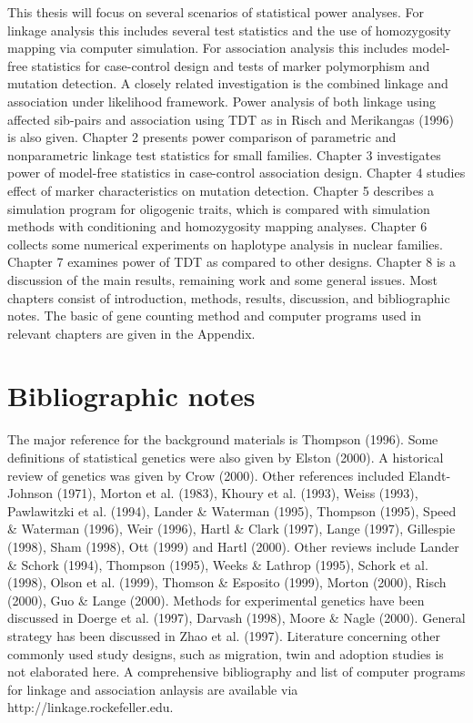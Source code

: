 This thesis will focus on several scenarios of statistical power analyses.  For
linkage analysis this includes several test statistics and the use of
homozygosity mapping via computer simulation.  For association analysis this
includes model-free statistics for case-control design and tests of marker
polymorphism and mutation detection.  A closely related investigation is the
combined linkage and association under likelihood framework.  Power analysis of
both linkage using affected sib-pairs and association using TDT as in Risch and
Merikangas (1996) is also given.  Chapter 2 presents power comparison of
parametric and nonparametric linkage test statistics for small families.
Chapter 3 investigates power of model-free statistics in case-control
association design.  Chapter 4 studies effect of marker characteristics on
mutation detection.  Chapter 5 describes a simulation program for oligogenic
traits, which is compared with simulation methods with conditioning and
homozygosity mapping analyses.  Chapter 6 collects some numerical experiments
on haplotype analysis in nuclear families.  Chapter 7 examines power of TDT as
compared to other designs.  Chapter 8 is a discussion of the main results,
remaining work and some general issues.  Most chapters consist of introduction,
methods, results, discussion, and bibliographic notes.  The basic of gene
counting method and computer programs used in relevant chapters are given in
the Appendix.

\section{Bibliographic notes}

The major reference for the background materials is Thompson (1996).  Some
definitions of statistical genetics were also given by Elston (2000).  A
historical review of genetics was given by Crow (2000).  Other references
included Elandt-Johnson (1971), Morton et al.  (1983), Khoury et al.  (1993),
Weiss (1993), Pawlawitzki et al.  (1994), Lander \& Waterman (1995), Thompson
(1995), Speed \& Waterman (1996), Weir (1996), Hartl \& Clark (1997), Lange
(1997), Gillespie (1998), Sham (1998), Ott (1999) and Hartl (2000).  Other
reviews include Lander \& Schork (1994), Thompson (1995), Weeks \& Lathrop
(1995), Schork et al.  (1998), Olson et al.  (1999), Thomson \& Esposito
(1999), Morton (2000), Risch (2000), Guo \& Lange (2000).  Methods for
experimental genetics have been discussed in Doerge et al.  (1997), Darvash
(1998), Moore \& Nagle (2000).  General strategy has been discussed in Zhao et
al.  (1997).  Literature concerning other commonly used study designs, such as
migration, twin and adoption studies is not elaborated here.  A comprehensive
bibliography and list of computer programs for linkage and association anlaysis
are available via http://linkage.rockefeller.edu.


